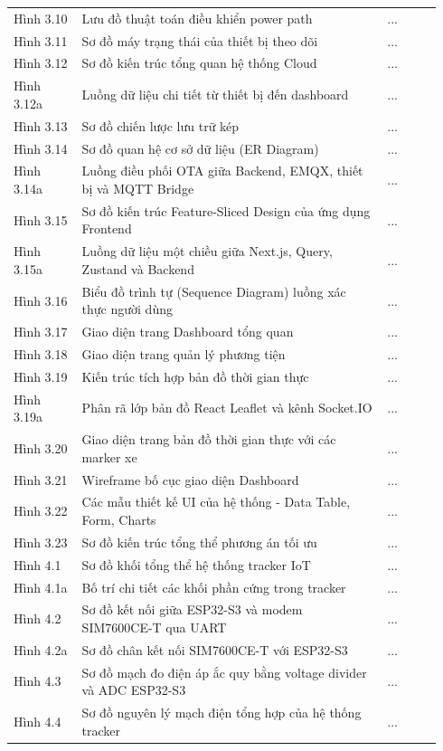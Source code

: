 \documentclass[13pt,a4paper]{extarticle}
\newcommand{\thesislongtableorignewline}{}
\let\thesislongtableorignewline\\
\renewcommand{\\}{\thesislongtableorignewline\hline}%
\let\\\thesislongtableorignewline
\begin{document}
{\begin{longtable}{|C{0.15\linewidth}|L{0.67\linewidth}|C{0.12\linewidth}|}
Hình 3.10 & Lưu đồ thuật toán điều khiển power path & ... \\
Hình 3.11 & Sơ đồ máy trạng thái của thiết bị theo dõi & ... \\
Hình 3.12 & Sơ đồ kiến trúc tổng quan hệ thống Cloud & ... \\
Hình 3.12a & Luồng dữ liệu chi tiết từ thiết bị đến dashboard & ... \\
Hình 3.13 & Sơ đồ chiến lược lưu trữ kép & ... \\
Hình 3.14 & Sơ đồ quan hệ cơ sở dữ liệu (ER Diagram) & ... \\
Hình 3.14a & Luồng điều phối OTA giữa Backend, EMQX, thiết bị và MQTT
Bridge & ... \\
Hình 3.15 & Sơ đồ kiến trúc Feature-Sliced Design của ứng dụng Frontend
& ... \\
Hình 3.15a & Luồng dữ liệu một chiều giữa Next.js, Query, Zustand và
Backend & ... \\
Hình 3.16 & Biểu đồ trình tự (Sequence Diagram) luồng xác thực người
dùng & ... \\
Hình 3.17 & Giao diện trang Dashboard tổng quan & ... \\
Hình 3.18 & Giao diện trang quản lý phương tiện & ... \\
Hình 3.19 & Kiến trúc tích hợp bản đồ thời gian thực & ... \\
Hình 3.19a & Phân rã lớp bản đồ React Leaflet và kênh Socket.IO & ... \\
Hình 3.20 & Giao diện trang bản đồ thời gian thực với các marker xe &
... \\
Hình 3.21 & Wireframe bố cục giao diện Dashboard & ... \\
Hình 3.22 & Các mẫu thiết kế UI của hệ thống - Data Table, Form, Charts
& ... \\
Hình 3.23 & Sơ đồ kiến trúc tổng thể phương án tối ưu & ... \\
Hình 4.1 & Sơ đồ khối tổng thể hệ thống tracker IoT & ... \\
Hình 4.1a & Bố trí chi tiết các khối phần cứng trong tracker & ... \\
Hình 4.2 & Sơ đồ kết nối giữa ESP32-S3 và modem SIM7600CE-T qua UART &
... \\
Hình 4.2a & Sơ đồ chân kết nối SIM7600CE-T với ESP32-S3 & ... \\
Hình 4.3 & Sơ đồ mạch đo điện áp ắc quy bằng voltage divider và ADC
ESP32-S3 & ... \\
Hình 4.4 & Sơ đồ nguyên lý mạch điện tổng hợp của hệ thống tracker &
... \\

\end{longtable}}
\end{document}
